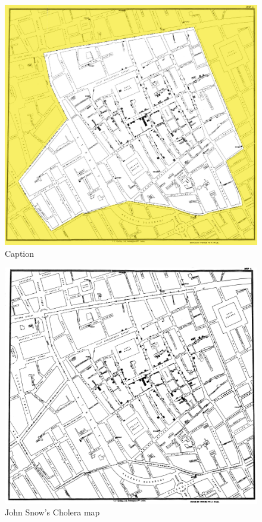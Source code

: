 \documentclass[12pt]{article}
\begin{document}
\begin{figure}
\centering
\includegraphics{snowmap_1854}
\caption{Caption}
\label{fig:snow}
\end{figure}

\begin{figure}
\centering
\includegraphics[scale=0.1]{Snow-cholera-map-1}
\caption{John Snow's Cholera map}
\label{fig:snow}
\end{figure}
\end{document}
